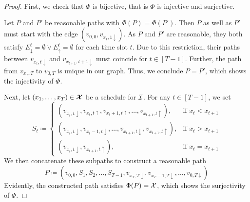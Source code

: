 \begin{proof}
First, we check that $\Phi$ is bijective, that is $\Phi$ is injective and surjective. 

Let $P$ and $P'$ be reasonable paths with $\Phi(P)=\Phi(P')$. Then $P$ as well as $P'$ must start with the edge $(v_{0,0},v_{x_1,1\downarrow})$. As $P$ and $P'$ are reasonable, they both satisfy $E_\downarrow^t=\emptyset \lor E_\uparrow^t=\emptyset$ for each time slot $t$. Due to this restriction, their paths between $v_{x_t,t\downarrow}$ and $v_{x_{t+1},t+1\downarrow}$ must coincide for $t\in[T-1]$. Further, the path from $v_{x_T,T}$ to $v_{0,T}$ is unique in our graph. Thus, we conclude $P=P'$, which shows the injectivity of $\Phi$.

Next, let $(x_1,\ldots,x_T)\in\bm{\mathcal{X}}$ be a schedule for $\mathcal{I}$. For any $t\in[T-1]$, we set
\begin{equation*}
	S_t\coloneqq
	\begin{cases}
		(v_{x_t,t\downarrow},v_{x_t,t\uparrow},v_{x_t+1,t\uparrow},\ldots,v_{x_{t+1},t\uparrow}), & \text{if $x_t<x_{t+1}$}\\
		(v_{x_t,t\downarrow},v_{x_t-1,t\downarrow},\ldots,v_{x_{t+1},t\downarrow},v_{x_{t+1},t\uparrow}), & \text{if $x_t>x_{t+1}$}\\
		(v_{x_t,t\downarrow},v_{x_{t+1},t\uparrow}), & \text{if $x_t=x_{t+1}$}
	\end{cases}
\end{equation*}
We then concatenate these subpaths to construct a reasonable path
\begin{equation*}
	P\coloneqq(v_{0,0},S_1,S_2,\ldots,S_{T-1},v_{x_T,T\downarrow},v_{x_T-1,T\downarrow},\ldots,v_{0,T\downarrow})
\end{equation*}
Evidently, the constructed path satisfies $\Phi(P)=\mathcal{X}$, which shows the surjectivity of $\Phi$.


\end{proof}
